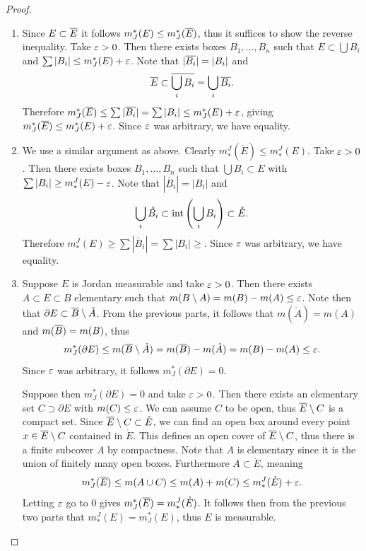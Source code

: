 \documentclass[hw_all.tex]{subfiles}
\begin{document}
\begin{proof}
    \hfill
    \begin{enumerate}[label=\roman*)]
        \item Since $E \subset \overline{E}$ it follows $m_J^*(E) \leq m_J^*(\overline{E})$, thus it suffices to show the reverse inequality. Take $\varepsilon > 0$. Then there exists boxes $B_1, \ldots, B_n$ such that $E \subset \bigcup B_i$ and $\sum |B_i| \leq m_J^*(E) + \varepsilon$. Note that $|\overline{B_i}| = |B_i|$ and
        \[
            \overline{E} \subset \overline{\bigcup_i B_i} = \bigcup_i \overline{B_i}
        .\]
        Therefore $m_J^*(\overline{E}) \leq \sum |\overline{B_i}| = \sum |B_i| \leq m_J^*(E) + \varepsilon$, giving $m_J^*(\overline{E}) \leq m_J^*(E) + \varepsilon$. Since $\varepsilon$ was arbitrary, we have equality.

    \item We use a similar argument as above. Clearly $m^J_*(\mathring{E}) \leq m^J_*(E)$. Take $\varepsilon > 0$. Then there exists boxes $B_1, \ldots, B_n$ such that $\bigcup B_i \subset E$ with $\sum |B_i| \geq m^J_*(E) - \varepsilon$. Note that $|\mathring{B_i}| = |B_i|$ and
        \[
            \bigcup_{i} \mathring{B_i} \subset \operatorname{int}\qty(\bigcup_i B_i) \subset \mathring{E}
        .\]
        Therefore $m^J_*(E) \geq \sum |\mathring{B_i}| = \sum |B_i| \geq$. Since $\varepsilon$ was arbitrary, we have equality.

        \item 
            Suppose $E$ is Jordan measurable and take $\varepsilon > 0$. Then there exists $A \subset E \subset B$ elementary such that $m(B \setminus A) = m(B) - m(A) \leq \varepsilon$. Note then that $\partial E \subset \overline{B} \setminus \mathring{A}$. From the previous parts, it follows that $m(\mathring{A}) = m(A)$ and $m(\overline{B}) = m(B)$, thus
            \[
               m_J^*(\partial E) \leq m(\overline{B} \setminus \mathring{A}) = m(\overline{B}) - m(\mathring{A}) = m(B) - m(A) \leq \varepsilon
            .\]
            Since $\varepsilon$ was arbitrary, it follows $m_J^*(\partial E) = 0$.
        
            Suppose then $m_J^*(\partial E) = 0$ and take $\varepsilon > 0$. Then there exists an elementary set $C \supset \partial E$ with $m(C) \leq \varepsilon$. We can assume $C$ to be open, thus $\overline{E} \setminus C$ is a compact set. Since $\overline{E} \setminus C \subset \mathring{E}$, we can find an open box around every point $x \in \overline{E} \setminus C$ contained in $\mathring{E}$. This defines an open cover of $\overline{E} \setminus C$, thus there is a finite subcover $A$ by compactness. Note that $A$ is elementary since it is the union of finitely many open boxes. Furthermore $A \subset \mathring{E}$, meaning
            \[
                m_J^*(\overline{E}) \leq m(A \cup C) \leq m(A) + m(C) \leq m^J_*(\mathring{E}) + \varepsilon
            .\]
            Letting $\varepsilon$ go to $0$ gives $m_J^*(\overline{E}) = m^J_*(\mathring{E})$. It follows then from the previous two parts that $m^J_*(E) = m_J^*(E)$, thus $E$ is measurable.


\end{enumerate}
\end{proof}
\end{document}
